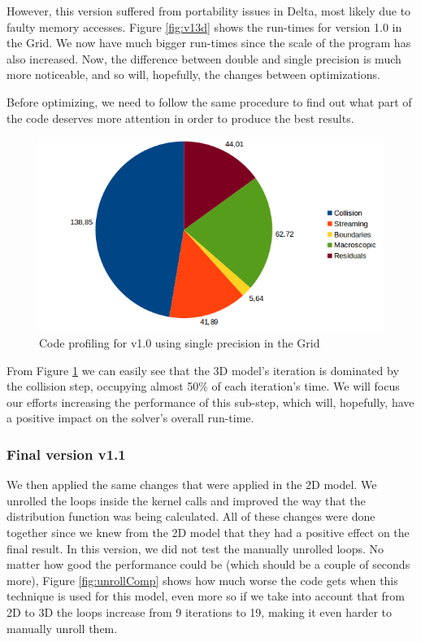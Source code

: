 \documentclass[12pt]{book}
\begin{document}
 However, this version suffered from portability issues in Delta, most likely due to faulty memory accesses. Figure \ref{fig:v13d} shows the run-times for version 1.0 in the Grid. We now have much bigger run-times since the scale of the program has also increased. Now, the difference between double and single precision is much more noticeable, and so will, hopefully, the changes between optimizations. \par
 Before optimizing, we need to follow the same procedure to find out what part of the code deserves more attention in order to produce the best results.
 
    \begin{figure}[H]
    	\centering
    	\includegraphics[width=\linewidth]{Resources/Images/v13dprofile.png}
    	\caption{Code profiling for v1.0 using single precision in the Grid}
    	\label{fig:v13dprofile}
    \end{figure}
 
 From Figure \ref{fig:v13dprofile} we can easily see that the 3D model's iteration is dominated by the collision step, occupying almost 50\% of each iteration's time. We will focus our efforts increasing the performance of this sub-step, which will, hopefully, have a positive impact on the solver's overall run-time.
 
\subsubsection{Final version v1.1}
We then applied the same changes that were applied in the 2D model. We unrolled the loops inside the kernel calls and improved the way that the distribution function was being calculated. All of these changes were done together since we knew from the 2D model that they had a positive effect on the final result. In this version, we did not test the manually unrolled loops. No matter how good the performance could be (which should be a couple of seconds more), Figure \ref{fig:unrollComp} shows how much worse the code gets when this technique is used for this model, even more so if we take into account that from 2D to 3D the loops increase from 9 iterations to 19, making it even harder to manually unroll them.
\end{document}
